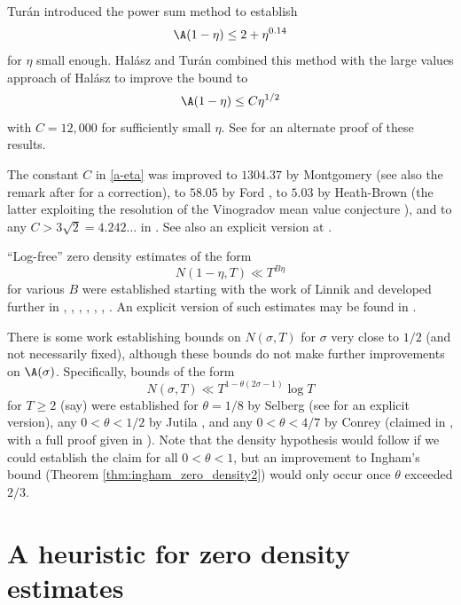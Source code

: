 Tur\'an \cite{turan} introduced the power sum method to establish
$$ \A(1-\eta) \leq 2 + \eta^{0.14}$$
for $\eta$ small enough. Hal\'asz and Tur\'an \cite{halasz_distribution_1969} combined this method with the large values approach of Hal\'asz \cite{halasz_1968} to improve the bound to
\begin{equation}\label{a-eta}
  \A(1-\eta) \leq C \eta^{1/2}
\end{equation}
with $C = 12,000$ for sufficiently small $\eta$.  See \cite{pintz_2022} for an alternate proof of these results.

The constant $C$ in \eqref{a-eta} was improved to $1304.37$ by Montgomery \cite[Theorem 12.3]{montgomery_topics_1971} (see also the remark after \cite[(11.97)]{ivic} for a correction), to $58.05$ by Ford \cite{FordZeta}, to $5.03$ by Heath-Brown \cite{heathbrown_new_2017} (the latter exploiting the resolution of the Vinogradov mean value conjecture \cite{bourgain_demeter_guth}), and to any $C > 3\sqrt{2}=4.242\dots$ in \cite{pintz_density_2023}. See also an explicit version at \cite{bellotti}.

``Log-free'' zero density estimates of the form
$$ N(1-\eta,T) \ll T^{B\eta}$$
for various $B$ were established starting with the work of Linnik \cite{linnik-1,linnik-2} and developed further in \cite{turan}, \cite{fogels}, \cite{bombieri_1974}, \cite{jutila_linnik}, \cite{gallagher_large_sieve}, \cite{graham_1978}, \cite{heath_brown_least_prime}. An explicit version of such estimates may be found in \cite{bellotti_2024}.

There is some work establishing bounds on $N(\sigma,T)$ for $\sigma$ very close to $1/2$ (and not necessarily fixed), although these bounds do not make further improvements on $\A(\sigma)$.  Specifically, bounds of the form
$$ N(\sigma,T) \ll T^{1-\theta(2\sigma-1)} \log T$$
for $T \geq 2$ (say) were established for $\theta=1/8$ by Selberg \cite{selberg_1946} (see \cite{simonic} for an explicit version), any $0 < \theta < 1/2$ by Jutila \cite{jutila-critical}, and any $0 < \theta < 4/7$ by Conrey (claimed in \cite{conrey_at_1989}, with a full proof given in \cite{baluyot_thesis}).  Note that the density hypothesis would follow if we could establish the claim for all $0 < \theta < 1$, but an improvement to Ingham's bound (Theorem \ref{thm:ingham_zero_density2}) would only occur once $\theta$ exceeded $2/3$.

\section{A heuristic for zero density estimates}

